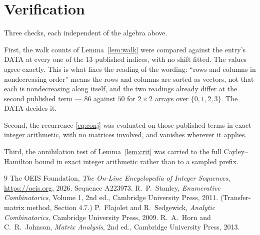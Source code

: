 \documentclass[11pt,a4paper]{article}
\theoremstyle{plain}
\theoremstyle{definition}
\begin{document}
\section{Verification}

Three checks, each independent of the algebra above.

First, the walk counts of Lemma~\ref{lem:walk} were compared against the entry's DATA at
every one of the $13$ published indices, with no shift fitted. The values agree exactly.
This is what fixes the reading of the wording: ``rows and columns in nondecreasing order''
means the rows and columns are sorted as vectors, not that each is nondecreasing along
itself, and the two readings already differ at the second published term --- $86$ against
$50$ for $2\times2$ arrays over $\{0,1,2,3\}$. The DATA decides it.

Second, the recurrence \eqref{eq:conj} was evaluated on those published terms in exact
integer arithmetic, with no matrices involved, and vanishes wherever it applies.

Third, the annihilation test of Lemma~\ref{lem:crit} was carried to the full
Cayley--Hamilton bound in exact integer arithmetic rather than to a sampled prefix.

\begin{thebibliography}{9}
 The OEIS Foundation, \emph{The On-Line Encyclopedia of Integer
Sequences}, \url{https://oeis.org}, 2026. Sequence A223973.
 R.~P.~Stanley, \emph{Enumerative Combinatorics}, Volume 1, 2nd ed.,
Cambridge University Press, 2011. (Transfer-matrix method, Section 4.7.)
 P.~Flajolet and R.~Sedgewick, \emph{Analytic Combinatorics}, Cambridge
University Press, 2009.
 R.~A.~Horn and C.~R.~Johnson, \emph{Matrix Analysis}, 2nd ed., Cambridge
University Press, 2013.
\end{thebibliography}
\end{document}
